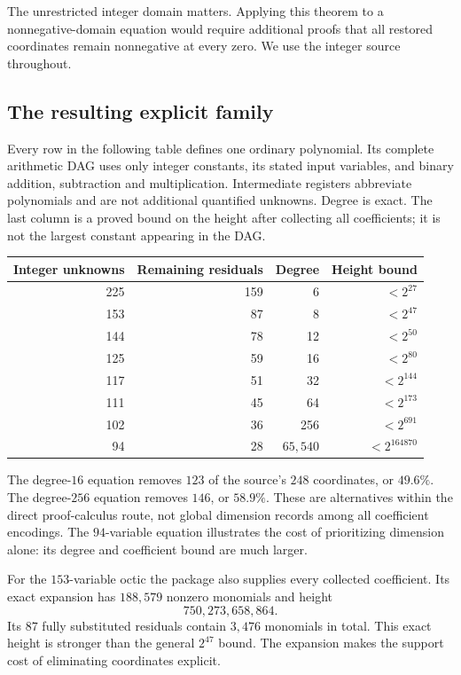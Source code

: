 \documentclass[11pt,letterpaper]{article}
\theoremstyle{definition}
\theoremstyle{remark}
\begin{document}
The unrestricted integer domain matters.  Applying this theorem to a
nonnegative-domain equation would require additional proofs that all
restored coordinates remain nonnegative at every zero.  We use the
integer source throughout.

\subsection{The resulting explicit family}

Every row in the following table defines one ordinary polynomial.  Its
complete arithmetic DAG uses only integer constants, its stated input
variables, and binary addition, subtraction and multiplication.
Intermediate registers abbreviate polynomials and are not additional
quantified unknowns.  Degree is exact.  The last column is a proved bound
on the height after collecting all coefficients; it is not the largest
constant appearing in the DAG.

\begin{center}
\begin{tabular}{rrrr}
\hline
Integer unknowns & Remaining residuals & Degree & Height bound \\
\hline
225 & 159 & 6 & $<2^{27}$ \\
153 & 87 & 8 & $<2^{47}$ \\
144 & 78 & 12 & $<2^{50}$ \\
125 & 59 & 16 & $<2^{80}$ \\
117 & 51 & 32 & $<2^{144}$ \\
111 & 45 & 64 & $<2^{173}$ \\
102 & 36 & 256 & $<2^{691}$ \\
94 & 28 & $65{,}540$ & $<2^{164870}$ \\
\hline
\end{tabular}
\end{center}

The degree-$16$ equation removes $123$ of the source's $248$ coordinates,
or $49.6\%$.  The degree-$256$ equation removes $146$, or $58.9\%$.
These are alternatives within the direct proof-calculus route, not
global dimension records among all coefficient encodings.  The
$94$-variable equation illustrates the cost of prioritizing dimension
alone: its degree and coefficient bound are much larger.

For the $153$-variable octic the package also supplies every collected
coefficient.  Its exact expansion has $188{,}579$ nonzero monomials and
height
\[
 750{,}273{,}658{,}864.
\]
Its $87$ fully substituted residuals contain $3{,}476$ monomials in total.
This exact height is stronger than the general $2^{47}$ bound.  The
expansion makes the support cost of eliminating coordinates explicit.
\end{document}
